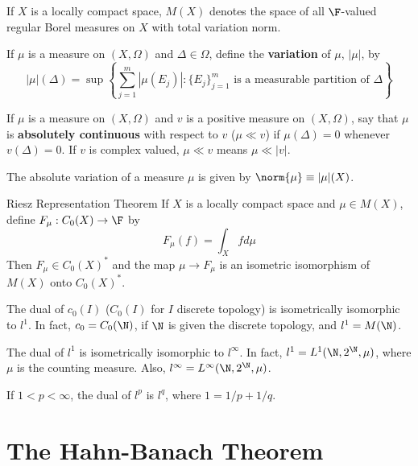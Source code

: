 If $X$ is a locally compact space, $M(X)$ denotes the space of all $\F$-valued regular Borel measures on $X$ with total variation norm.

\begin{defn}
    If $\mu$ is a measure on $(X,\Omega)$ and $\Delta \in \Omega$, define the \textbf{variation} of $\mu$, $|\mu|$, by $$|\mu|(\Delta) = \sup\left\{\sum_{j=1}^m|\mu(E_j)|:\{E_j\}_{j=1}^m\text{ is a measurable partition of $\Delta$}\right\}$$
\end{defn}


\begin{defn}
    If $\mu$ is a measure on $(X,\Omega)$ and $v$ is a positive measure on $(X,\Omega)$, say that $\mu$ is \textbf{absolutely continuous} with respect to $v$ ($\mu \ll v$) if $\mu(\Delta) = 0$ whenever $v(\Delta) = 0$. If $v$ is complex valued, $\mu \ll v$ means $\mu \ll |v|$.
\end{defn}

The absolute variation of a measure $\mu$ is given by $\norm{\mu} \equiv |\mu|(X)$.

\begin{nthm}{Riesz Representation Theorem}
    If $X$ is a locally compact space and $\mu \in M(X)$, define $F_{\mu}:C_0(X)\rightarrow \F$ by $$F_{\mu}(f) = \int_Xf d\mu$$
    Then $F_{\mu} \in C_0(X)^*$ and the map $\mu\rightarrow F_{\mu}$ is an isometric isomorphism of $M(X)$ onto $C_0(X)^*$.
\end{nthm}

\begin{eg}
    The dual of $c_0(I)$ ($C_0(I)$ for $I$ discrete topology) is isometrically isomorphic to $l^1$. In fact, $c_0 = C_0(\N)$, if $\N$ is given the discrete topology, and $l^1 = M(\N)$.
\end{eg}

\begin{eg}
    The dual of $l^1$ is isometrically isomorphic to $l^{\infty}$. In fact, $l^1 = L^1(\N,2^{\N},\mu)$, where $\mu$ is the counting measure. Also, $l^{\infty} = L^{\infty}(\N,2^{\N},\mu)$.
\end{eg}

\begin{eg}
    If $1 < p <\infty$, the dual of $l^p$ is $l^q$, where $1 = 1/p+1/q$.
\end{eg}


\section{The Hahn-Banach Theorem}
\label{sec:HanhBanach}

